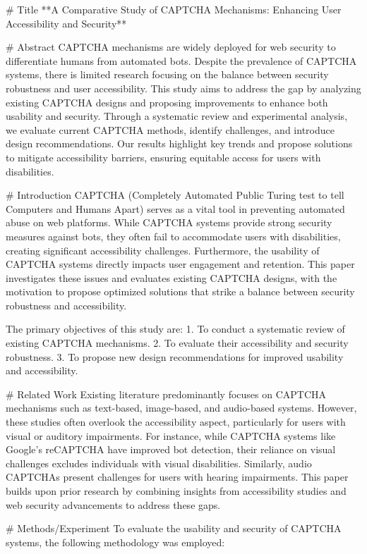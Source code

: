 # Title  
**A Comparative Study of CAPTCHA Mechanisms: Enhancing User Accessibility and Security**

# Abstract  
CAPTCHA mechanisms are widely deployed for web security to differentiate humans from automated bots. Despite the prevalence of CAPTCHA systems, there is limited research focusing on the balance between security robustness and user accessibility. This study aims to address the gap by analyzing existing CAPTCHA designs and proposing improvements to enhance both usability and security. Through a systematic review and experimental analysis, we evaluate current CAPTCHA methods, identify challenges, and introduce design recommendations. Our results highlight key trends and propose solutions to mitigate accessibility barriers, ensuring equitable access for users with disabilities.

# Introduction  
CAPTCHA (Completely Automated Public Turing test to tell Computers and Humans Apart) serves as a vital tool in preventing automated abuse on web platforms. While CAPTCHA systems provide strong security measures against bots, they often fail to accommodate users with disabilities, creating significant accessibility challenges. Furthermore, the usability of CAPTCHA systems directly impacts user engagement and retention. This paper investigates these issues and evaluates existing CAPTCHA designs, with the motivation to propose optimized solutions that strike a balance between security robustness and accessibility.

The primary objectives of this study are:  
1. To conduct a systematic review of existing CAPTCHA mechanisms.  
2. To evaluate their accessibility and security robustness.  
3. To propose new design recommendations for improved usability and accessibility.

# Related Work  
Existing literature predominantly focuses on CAPTCHA mechanisms such as text-based, image-based, and audio-based systems. However, these studies often overlook the accessibility aspect, particularly for users with visual or auditory impairments. For instance, while CAPTCHA systems like Google's reCAPTCHA have improved bot detection, their reliance on visual challenges excludes individuals with visual disabilities. Similarly, audio CAPTCHAs present challenges for users with hearing impairments. This paper builds upon prior research by combining insights from accessibility studies and web security advancements to address these gaps.

# Methods/Experiment  
To evaluate the usability and security of CAPTCHA systems, the following methodology was employed:

